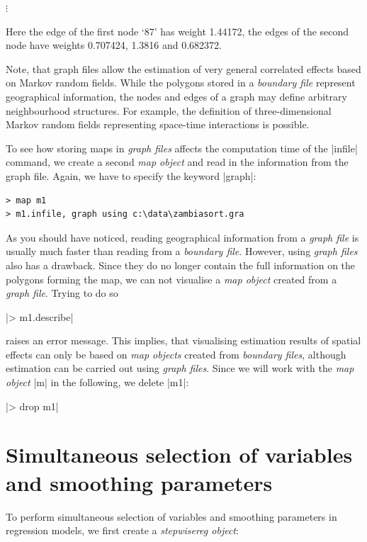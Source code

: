 \hspace{1cm} $\vdots$

\normalsize

\vspace{0.5cm}

Here the edge of the first node `87' has weight 1.44172, the edges of the second node have weights 0.707424, 1.3816 and
0.682372.

Note, that graph files allow the estimation of very general correlated effects based on Markov random fields. While the
polygons stored in a {\it boundary file} represent geographical information, the nodes and edges of a graph may define
arbitrary neighbourhood structures. For example, the definition of three-dimensional Markov random fields representing
space-time interactions is possible.

To see how storing maps in {\it graph files} affects the computation time of the |infile| command, we create a second {\it map
object} and read in the information from the graph file. Again, we have to specify the keyword |graph|:

\begin{verbatim}
> map m1
> m1.infile, graph using c:\data\zambiasort.gra
\end{verbatim}

As you should have noticed, reading geographical information from a {\it graph file} is usually much faster than reading from a
{\it boundary file}. However, using {\it graph files} also has a drawback. Since they do no longer contain the full information
on the polygons forming the map, we can not visualise a {\it map object} created from a {\it graph file}. Trying to do so

|> m1.describe|

raises an error message. This implies, that visualising estimation results of spatial effects can only be based on {\it map
objects} created from {\it boundary files}, although estimation can be carried out using {\it graph files}. Since we will work
with the {\it map object} |m| in the following, we delete |m1|:

|> drop m1|

\section[Simultaneously selecting variables and smoothing parameters]{Simultaneous selection of variables and smoothing parameters}
\label{step:regression}

To perform  simultaneous selection of variables and smoothing parameters in regression models, we first create a {\it
stepwisereg object}:

